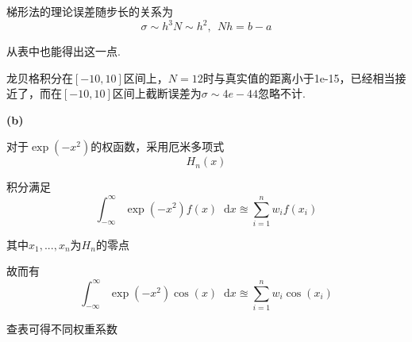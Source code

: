 \documentclass[UTF8]{ctexart}
\newcommand*{\dif}{\mathop{}\!\mathrm{d}}
\begin{document}
梯形法的理论误差随步长的关系为
$$\sigma\sim h^3N\sim h^2,\ \ Nh=b-a$$

从表中也能得出这一点.

龙贝格积分在$[-10,10]$区间上，$N=12$时与真实值的距离小于1e-15，已经相当接近了，而在$[-10,10]$区间上截断误差为$\sigma\sim 4e-44$忽略不计.

\noindent\textbf{(b)}

对于$\exp(-x^2)$的权函数，采用厄米多项式$$H_n(x)$$

积分满足
$$\int_{-\infty}^\infty \exp(-x^2)f(x)\dif x\approxeq\sum_{i=1}^{n}w_if(x_i)$$

其中$x_1,...,x_n$为$H_n$的零点

故而有
$$\int_{-\infty}^\infty \exp(-x^2)\cos(x)\dif x\approxeq\sum_{i=1}^n w_i\cos(x_i)$$

查表可得不同权重系数
\end{document}
